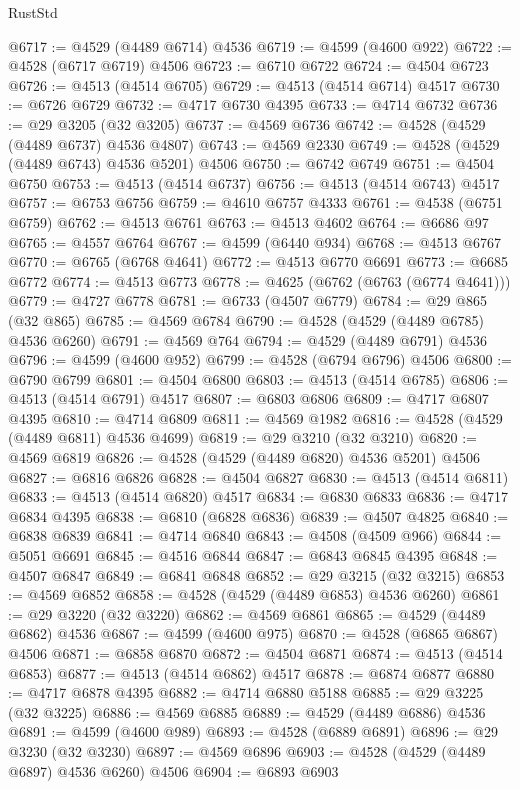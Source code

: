 \begin{lexlean}{RustStd}
\begin{coremodule}
@6717 := @4529 (@4489 @6714) @4536
@6719 := @4599 (@4600 @922)
@6722 := @4528 (@6717 @6719) @4506
@6723 := @6710 @6722
@6724 := @4504 @6723
@6726 := @4513 (@4514 @6705)
@6729 := @4513 (@4514 @6714) @4517
@6730 := @6726 @6729
@6732 := @4717 @6730 @4395
@6733 := @4714 @6732
@6736 := @29 @3205 (@32 @3205)
@6737 := @4569 @6736
@6742 := @4528 (@4529 (@4489 @6737) @4536 @4807)
@6743 := @4569 @2330
@6749 := @4528 (@4529 (@4489 @6743) @4536 @5201) @4506
@6750 := @6742 @6749
@6751 := @4504 @6750
@6753 := @4513 (@4514 @6737)
@6756 := @4513 (@4514 @6743) @4517
@6757 := @6753 @6756
@6759 := @4610 @6757 @4333
@6761 := @4538 (@6751 @6759)
@6762 := @4513 @6761
@6763 := @4513 @4602
@6764 := @6686 @97
@6765 := @4557 @6764
@6767 := @4599 (@6440 @934)
@6768 := @4513 @6767
@6770 := @6765 (@6768 @4641)
@6772 := @4513 @6770 @6691
@6773 := @6685 @6772
@6774 := @4513 @6773
@6778 := @4625 (@6762 (@6763 (@6774 @4641)))
@6779 := @4727 @6778
@6781 := @6733 (@4507 @6779)
@6784 := @29 @865 (@32 @865)
@6785 := @4569 @6784
@6790 := @4528 (@4529 (@4489 @6785) @4536 @6260)
@6791 := @4569 @764
@6794 := @4529 (@4489 @6791) @4536
@6796 := @4599 (@4600 @952)
@6799 := @4528 (@6794 @6796) @4506
@6800 := @6790 @6799
@6801 := @4504 @6800
@6803 := @4513 (@4514 @6785)
@6806 := @4513 (@4514 @6791) @4517
@6807 := @6803 @6806
@6809 := @4717 @6807 @4395
@6810 := @4714 @6809
@6811 := @4569 @1982
@6816 := @4528 (@4529 (@4489 @6811) @4536 @4699)
@6819 := @29 @3210 (@32 @3210)
@6820 := @4569 @6819
@6826 := @4528 (@4529 (@4489 @6820) @4536 @5201) @4506
@6827 := @6816 @6826
@6828 := @4504 @6827
@6830 := @4513 (@4514 @6811)
@6833 := @4513 (@4514 @6820) @4517
@6834 := @6830 @6833
@6836 := @4717 @6834 @4395
@6838 := @6810 (@6828 @6836)
@6839 := @4507 @4825
@6840 := @6838 @6839
@6841 := @4714 @6840
@6843 := @4508 (@4509 @966)
@6844 := @5051 @6691
@6845 := @4516 @6844
@6847 := @6843 @6845 @4395
@6848 := @4507 @6847
@6849 := @6841 @6848
@6852 := @29 @3215 (@32 @3215)
@6853 := @4569 @6852
@6858 := @4528 (@4529 (@4489 @6853) @4536 @6260)
@6861 := @29 @3220 (@32 @3220)
@6862 := @4569 @6861
@6865 := @4529 (@4489 @6862) @4536
@6867 := @4599 (@4600 @975)
@6870 := @4528 (@6865 @6867) @4506
@6871 := @6858 @6870
@6872 := @4504 @6871
@6874 := @4513 (@4514 @6853)
@6877 := @4513 (@4514 @6862) @4517
@6878 := @6874 @6877
@6880 := @4717 @6878 @4395
@6882 := @4714 @6880 @5188
@6885 := @29 @3225 (@32 @3225)
@6886 := @4569 @6885
@6889 := @4529 (@4489 @6886) @4536
@6891 := @4599 (@4600 @989)
@6893 := @4528 (@6889 @6891)
@6896 := @29 @3230 (@32 @3230)
@6897 := @4569 @6896
@6903 := @4528 (@4529 (@4489 @6897) @4536 @6260) @4506
@6904 := @6893 @6903

\end{coremodule}
\end{lexlean}
